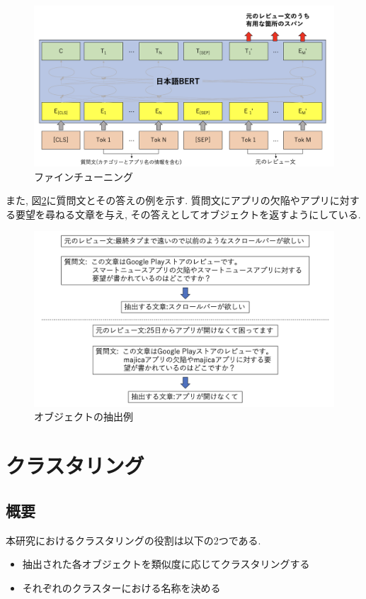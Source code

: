 \begin{figure}[H]
  \centering
  \includegraphics[scale=0.3]
       {contents/images/fine-tuning.png}
  \caption{ファインチューニング\label{fig:fine-tuning}}
\end{figure}

また, 図\ref{fig:answer}に質問文とその答えの例を示す. 質問文にアプリの欠陥やアプリに対する要望を尋ねる文章を与え, その答えとしてオブジェクトを返すようにしている. 

\begin{figure}[H]
  \centering
  \includegraphics[scale=0.4]
       {contents/images/answer.png}
  \caption{オブジェクトの抽出例\label{fig:answer}}
\end{figure}


\section{クラスタリング}
\subsection{概要}
本研究におけるクラスタリングの役割は以下の2つである. 
\begin{itemize}
  \item 抽出された各オブジェクトを類似度に応じてクラスタリングする
  \item それぞれのクラスターにおける名称を決める
\end{itemize}

